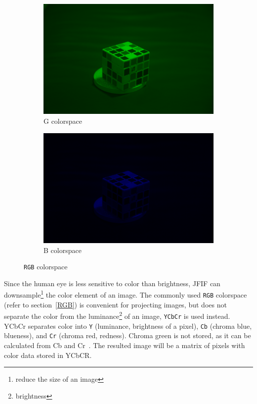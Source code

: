 \documentclass{article}
\begin{document}
\begin{figure}[h]
\begin{subfigure}[b]{0.4\textwidth}
\begin{center}
	\includegraphics[width=\textwidth]{./implementation/experiment/green.png}
\end{center}
\caption{G colorspace}
\end{subfigure}%
\begin{subfigure}[b]{0.4\textwidth}
\begin{center}
	\includegraphics[width=\textwidth]{./implementation/experiment/blue.png}
\end{center}
\caption{B colorspace}
\end{subfigure}
\caption{\texttt{RGB} colorspace}
\label{fig:rgb}
\end{figure}

Since the human eye is less sensitive to color than brightness, JFIF can downsample\footnote{reduce the size of an image} the color element of an image.
	The commonly used \texttt{RGB} colorspace (refer to section~\ref{RGB}) is convenient for projecting images, but does not separate the color from the luminance\footnote{brightness} of an image, \texttt{YCbCr} is used instead.
YCbCr separates color into \texttt{Y} (luminance, brightness of a pixel), \texttt{Cb} (chroma blue, blueness), and \texttt{Cr} (chroma red, redness).
Chroma green is not stored, as it can be calculated from Cb and Cr~\autocite{ycbcrMedia}.
The resulted image will be a matrix of pixels with color data stored in YCbCR.
\end{document}

